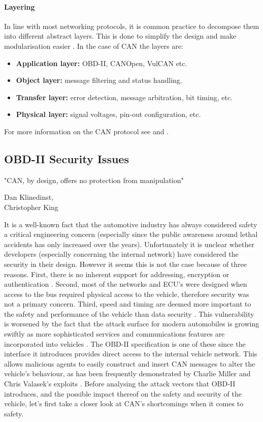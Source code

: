 \documentclass[11pt]{article}
\begin{document}
\paragraph{Layering}

In line with most networking protocols, it is common practice to decompose them into different abstract layers. This is done to simplify the design and make modularisation easier \cite{Protocolwiki}. In the case of CAN the layers are:

\begin{itemize}
	\item \textbf{Application layer:} OBD-II, CANOpen, VulCAN etc.
	\item \textbf{Object layer:} message filtering and status handling.
	\item \textbf{Transfer layer:} error detection, message arbitration, bit timing, etc.
	\item \textbf{Physical layer:} signal voltages, pin-out configuration, etc.
\end{itemize}

For more information on the CAN protocol see \cite{ISO11898-2} and \cite{ISO11898-3}.

\subsection{OBD-II Security Issues}
\label{sec:issues}

\epigraph{"CAN, by design, offers no protection from manipulation"}{Dan Klinedinst, \\ Christopher King}

It is a well-known fact that the automotive industry has always considered safety a critical engineering concern (especially since the public awareness around lethal accidents has only increased over the years). Unfortunately it is unclear whether developers (especially concerning the internal network) have considered the security in their design. However it seems this is not the case because of three reasons. First, there is no inherent support for addressing, encryption or authentication \cite{MillerB}. Second, most of the networks and ECU's were designed when access to the bus required physical access to the vehicle, therefore security was not a primary concern. Third, speed and timing are deemed more important to the safety and performance of the vehicle than data security \cite{Klinedinst05}. This vulnerability is worsened by the fact that the attack surface for modern automobiles is growing swiftly as more sophisticated services and communications features are incorporated into vehicles \cite{Kosher}. The OBD-II specification is one of these since the interface it introduces provides direct access to the internal vehicle network. This allows malicious agents to easily construct and insert CAN messages to alter the vehicle's behaviour, as has been frequently demonstrated by Charlie Miller and Chris Valasek’s exploits \cite{MillerA}\cite{MillerB}\cite{MillerC}. Before analysing the attack vectors that OBD-II introduces, and the possible impact thereof on the safety and security of the vehicle, let's first take a closer look at CAN's shortcomings when it comes to safety.
\end{document}
